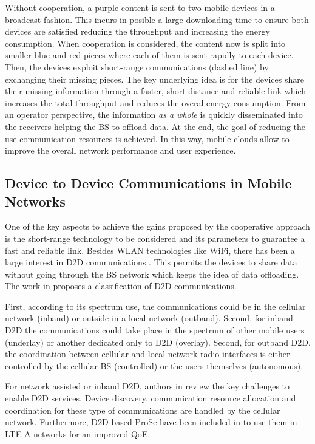 Without cooperation, a purple content is sent to two mobile devices in a broadcast fashion. This incurs in posible a large downloading time to ensure both devices are satisfied reducing the throughput and increasing the energy consumption.  When cooperation is considered, the content now is split into smaller blue and red pieces where each of them is sent rapidly to each device. Then, the devices exploit short-range communications (dashed line) by exchanging their missing pieces. The key underlying idea is for the devices share their missing information through a faster, short-distance and reliable link which increases the total throughput and reduces the overal energy consumption. From an operator perspective, the information \textit{as a whole} is quickly disseminated into the receivers helping the \ac{BS} to offload data. At the end, the goal of reducing the use communication resources is achieved. In this way, mobile clouds allow to improve the overall network performance and user experience.

\subsection{Device to Device Communications in Mobile Networks}
\label{sec:d2d}
One of the key aspects to achieve the gains proposed by the cooperative approach is the short-range technology to be considered and its parameters to guarantee a fast and reliable link. Besides \ac{WLAN} technologies like \ac{WiFi}, there has been a large interest in \ac{D2D} communications \cite{lin2013comprehensive,asadi2014survey,feng2014device,tehrani2014device}. This permits the devices to share data without going through the \ac{BS} network which keeps the idea of data offloading. The work in \cite{asadi2014survey} proposes a classification of \ac{D2D} communications.

First, according to its spectrum use, the communications could be in the cellular network (inband) or outside in a local network (outband). Second, for inband \ac{D2D} the communications could take place in the spectrum of other mobile users (underlay) or another dedicated only to \ac{D2D} (overlay). Second, for outband \ac{D2D}, the coordination between cellular and local network radio interfaces is either controlled by the cellular \ac{BS} (controlled) or the users themselves (autonomous).

For network assisted or inband \ac{D2D}, authors in \cite{fodor2014design} review the key challenges to enable \ac{D2D} services. Device discovery, communication resource allocation and coordination for these type of communications are handled by the cellular network. Furthermore, \ac{D2D} based \ac{ProSe} have been included in \cite{3gpp2012prose} to use them in \ac{LTE-A} networks for an improved \ac{QoE}.

